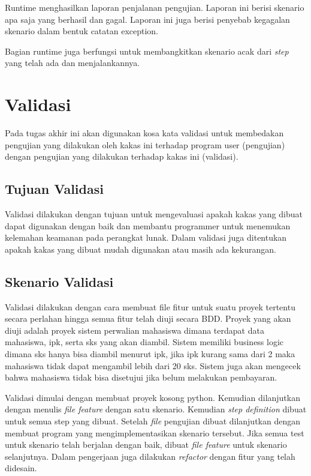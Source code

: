 Runtime menghasilkan laporan penjalanan pengujian. Laporan ini berisi skenario apa saja
yang berhasil dan gagal. Laporan ini juga berisi penyebab kegagalan skenario dalam
bentuk catatan exception.

Bagian runtime juga berfungsi untuk membangkitkan skenario acak dari \emph{step} yang telah ada
dan menjalankannya.




\section{Validasi}

Pada tugas akhir ini akan digunakan kosa kata validasi untuk membedakan pengujian yang dilakukan oleh kakas ini terhadap program user (pengujian)
dengan pengujian yang dilakukan terhadap kakas ini (validasi).

\subsection{Tujuan Validasi}

Validasi dilakukan dengan tujuan untuk mengevaluasi apakah kakas yang dibuat dapat digunakan dengan
baik dan membantu programmer untuk menemukan kelemahan keamanan pada perangkat lunak.
Dalam validasi juga ditentukan apakah kakas yang dibuat mudah digunakan atau masih ada kekurangan.

\subsection{Skenario Validasi}

Validasi dilakukan dengan cara membuat file fitur untuk suatu proyek tertentu secara perlahan hingga semua fitur
telah diuji secara BDD. Proyek yang akan diuji adalah proyek sistem perwalian mahasiswa dimana terdapat data mahasiswa, ipk,
serta sks yang akan diambil. Sistem memiliki business logic dimana sks hanya bisa diambil menurut ipk, jika ipk kurang sama dari
2 maka mahasiswa tidak dapat mengambil lebih dari 20 sks. Sistem juga akan mengecek bahwa mahasiswa tidak bisa disetujui
jika belum melakukan pembayaran.

Validasi dimulai dengan membuat proyek kosong python. Kemudian dilanjutkan dengan menulis \emph{file feature}
dengan satu skenario. Kemudian \emph{step definition} dibuat untuk semua step yang dibuat. Setelah \emph{file}
pengujian dibuat dilanjutkan dengan membuat program yang mengimplementasikan skenario tersebut. Jika semua
test untuk skenario telah berjalan dengan baik, dibuat \emph{file feature} untuk skenario selanjutnya.
Dalam pengerjaan juga dilakukan \emph{refactor} dengan fitur yang telah didesain.


